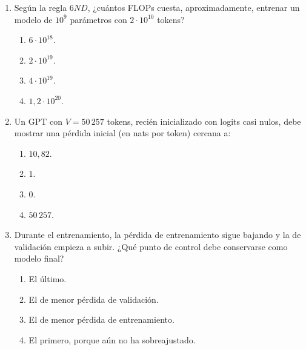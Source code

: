 \begin{enumerate}[label=\textbf{A.\arabic*.},ref=A.\arabic*,leftmargin=2.6em,itemsep=8pt]
\item\label{q:6nd} Según la regla $6ND$, ¿cuántos FLOPs cuesta, aproximadamente, entrenar un modelo de $10^{9}$ parámetros con $2\cdot 10^{10}$ tokens? \punto
\begin{enumerate}[label=(\alph*)]
  \item $6\cdot 10^{18}$.
  \item $2\cdot 10^{19}$.
  \item $4\cdot 10^{19}$.
  \item $1{,}2\cdot 10^{20}$.
\end{enumerate}

\item\label{q:lnV} Un GPT con $V=50\,257$ tokens, recién inicializado con logits casi nulos, debe mostrar una pérdida inicial (en nats por token) cercana a: \punto
\begin{enumerate}[label=(\alph*)]
  \item $10{,}82$.
  \item $1$.
  \item $0$.
  \item $50\,257$.
\end{enumerate}

\item\label{q:checkpoint} Durante el entrenamiento, la pérdida de entrenamiento sigue bajando y la de validación empieza a subir. ¿Qué punto de control debe conservarse como modelo final? \punto
\begin{enumerate}[label=(\alph*)]
  \item El último.
  \item El de menor pérdida de validación.
  \item El de menor pérdida de entrenamiento.
  \item El primero, porque aún no ha sobreajustado.
\end{enumerate}

\end{enumerate}
